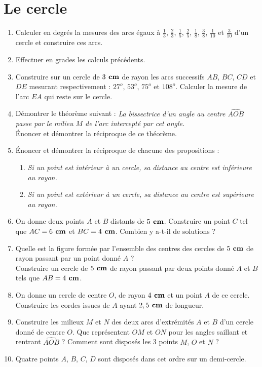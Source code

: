 
\chapter{Le cercle} 
\begin{enumerate}
\item Calculer en degrés la mesures des arcs égaux à $\frac13$, $\frac23$, $\frac15$, $\frac25$, $\frac18$, $\frac38$, $\frac1{10}$ et $\frac3{10}$ d'un cercle et construire ces arcs.
\item Effectuer en grades les calculs précédents.
\item Construire sur un cercle de $3\textbf{ cm}$ de rayon les arcs successifs $AB$, $BC$, $CD$ et $DE$ mesurant respectivement : $27^o$, $53^o$, $75^o$ et $108^o$. Calculer la mesure de l'arc $EA$ qui reste sur le cercle. 
\item Démontrer le théorème suivant : \emph{La bissectrice d'un angle au centre $\widehat{AOB}$ passe par le milieu $M$ de l'arc intercepté par cet angle.}\\ Énoncer et démontrer la réciproque de ce théorème. 
\item Énoncer et démontrer la réciproque de chacune des propositions : 
\begin{enumerate}
\item \emph{Si un point est intérieur à un cercle, sa distance au centre est inférieure au rayon.}
\item \emph{Si un point est extérieur à un cercle, sa distance au centre est supérieure au rayon.}
\end{enumerate}
\item On donne deux points $A$ et $B$ distants de $5\textbf{ cm}$. Construire un point $C$ tel que $AC= 6\textbf{ cm}$ et $BC = 4\textbf{ cm}$. Combien y a-t-il de solutions ?
\item Quelle est la figure formée par l'ensemble des centres des cercles de $5\textbf{ cm}$ de rayon passant par un point donné $A$ ? \\
Construire un cercle de $5\textbf{ cm}$ de rayon passant par deux points donné $A$ et $B$ tels que $AB=4\textbf{ cm}$. 
\item On donne un cercle de centre $O$, de rayon $4\textbf{ cm}$ et un point $A$ de ce cercle. Construire les cordes issues de $A$ ayant $2,5\textbf{ cm}$ de longueur. 
\item Construire les milieux $M$ et $N$ des deux arcs d'extrémités $A$ 
et $B$ d'un cercle donné de centre $O$. Que représentent $OM$ et $ON$ pour les angles saillant et rentrant $\widehat{AOB}$ ? Comment sont disposés les 3 points $M$, $O$ et $N$ ?
\item Quatre points $A$, $B$, $C$, $D$ sont disposés dans cet ordre sur un demi-cercle. \begin{enumerate}

\end{enumerate}
\end{enumerate}
